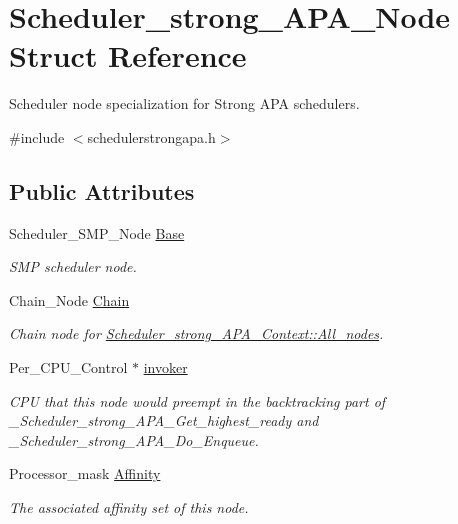 \hypertarget{structScheduler__strong__APA__Node}{}\section{Scheduler\+\_\+strong\+\_\+\+A\+P\+A\+\_\+\+Node Struct Reference}
\label{structScheduler__strong__APA__Node}


Scheduler node specialization for Strong A\+PA schedulers.  




{\ttfamily \#include $<$schedulerstrongapa.\+h$>$}

\subsection*{Public Attributes}
\begin{DoxyCompactItemize}
\item 
Scheduler\+\_\+\+S\+M\+P\+\_\+\+Node \hyperlink{structScheduler__strong__APA__Node_ae86cbf5fd8743267abe33bed6d8b0fe6}{Base}
\begin{DoxyCompactList}\small\item\em S\+MP scheduler node. \end{DoxyCompactList}\item 
Chain\+\_\+\+Node \hyperlink{structScheduler__strong__APA__Node_a9008e9546186a6b294f41151bc5a0a38}{Chain}
\begin{DoxyCompactList}\small\item\em Chain node for \hyperlink{structScheduler__strong__APA__Context_a9bf510496d095d8bca275f35030bb993}{Scheduler\+\_\+strong\+\_\+\+A\+P\+A\+\_\+\+Context\+::\+All\+\_\+nodes}. \end{DoxyCompactList}\item 
Per\+\_\+\+C\+P\+U\+\_\+\+Control $\ast$ \hyperlink{structScheduler__strong__APA__Node_a62a0611c52210e493da7d2f55dfd28ff}{invoker}
\begin{DoxyCompactList}\small\item\em C\+PU that this node would preempt in the backtracking part of \+\_\+\+Scheduler\+\_\+strong\+\_\+\+A\+P\+A\+\_\+\+Get\+\_\+highest\+\_\+ready and \+\_\+\+Scheduler\+\_\+strong\+\_\+\+A\+P\+A\+\_\+\+Do\+\_\+\+Enqueue. \end{DoxyCompactList}\item 
Processor\+\_\+mask \hyperlink{structScheduler__strong__APA__Node_a7672e477658785808b0069f11bc4d24e}{Affinity}
\begin{DoxyCompactList}\small\item\em The associated affinity set of this node. \end{DoxyCompactList}\end{DoxyCompactItemize}


